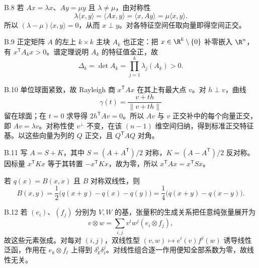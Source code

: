 \begin{solution}{B.8}
若 \(Ax=\lambda x\)、\(Ay=\mu y\) 且 \(\lambda\ne\mu\)，由对称性
\[
 \lambda\langle x,y\rangle=\langle Ax,y\rangle
 =\langle x,Ay\rangle=\mu\langle x,y\rangle.
\]
所以 \((\lambda-\mu)\langle x,y\rangle=0\)，从而 \(x\perp y\)。对各特征空间任取向量即得空间正交。
\end{solution}

\begin{solution}{B.9}
正定矩阵 \(A\) 的左上 \(k\times k\) 主块 \(A_k\) 也正定：把 \(x\in\R^k\setminus\{0\}\) 补零嵌入 \(\R^n\)，有 \(x^{\mathsf T}A_kx>0\)。谱定理说明 \(A_k\) 的特征值全正，故
\[
 \Delta_k=\det A_k=\prod_{j=1}^k\lambda_j(A_k)>0.
\]
\end{solution}

\begin{solution}{B.10}
单位球面紧致，故 Rayleigh 商 \(x^{\mathsf T}Ax\) 在其上有最大点 \(v\)。对 \(h\perp v\)，曲线
\[
 \gamma(t)=\frac{v+th}{\|v+th\|}
\]
留在球面；在 \(t=0\) 求导得 \(2h^{\mathsf T}Av=0\)。所以 \(Av\) 与 \(v\) 正交补中的每个向量正交，即 \(Av=\lambda v\)。对称性使 \(v^\perp\) 不变，在该 \((n-1)\) 维空间归纳，得到标准正交特征基。以这些向量为列的 \(Q\) 正交，且 \(Q^{\mathsf T}AQ\) 对角。
\end{solution}

\begin{solution}{B.11}
写 \(A=S+K\)，其中 \(S=(A+A^{\mathsf T})/2\) 对称，\(K=(A-A^{\mathsf T})/2\) 反对称。因标量 \(x^{\mathsf T}Kx\) 等于其转置 \(-x^{\mathsf T}Kx\)，故为零，所以 \(x^{\mathsf T}Ax=x^{\mathsf T}Sx\)。

若 \(q(x)=B(x,x)\) 且 \(B\) 对称双线性，则
\[
 B(x,y)=\frac12\bigl(q(x+y)-q(x)-q(y)\bigr)
 =\frac14\bigl(q(x+y)-q(x-y)\bigr).
\]
\end{solution}

\begin{solution}{B.12}
若 \((e_i)\)、\((f_j)\) 分别为 \(V,W\) 的基，张量积的生成关系把任意纯张量展开为
\[
 v\otimes w=\sum_{i,j}v^iw^j(e_i\otimes f_j),
\]
故这些元素张成。对每对 \((i,j)\)，双线性型 \((v,w)\mapsto e^i(v)f^j(w)\) 诱导线性泛函，作用在 \(e_k\otimes f_\ell\) 上得到 \(\delta^i_k\delta^j_\ell\)。对线性组合逐一作用便知全部系数为零，故线性无关。
\end{solution}
